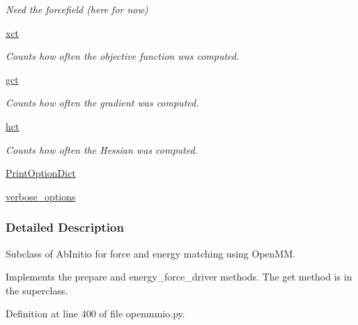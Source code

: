 \begin{DoxyCompactItemize}
\begin{DoxyCompactList}\small\item\em Need the forcefield (here for now) \end{DoxyCompactList}\item 
\hyperlink{classforcebalance_1_1target_1_1Target_aad2e385cfbf7b4a68f1c2cb41133fe82}{xct}
\begin{DoxyCompactList}\small\item\em Counts how often the objective function was computed. \end{DoxyCompactList}\item 
\hyperlink{classforcebalance_1_1target_1_1Target_aa625ac88c6744eb14ef281d9496d0dbb}{gct}
\begin{DoxyCompactList}\small\item\em Counts how often the gradient was computed. \end{DoxyCompactList}\item 
\hyperlink{classforcebalance_1_1target_1_1Target_a5b5a42f78052b47f29ed4b940c6111a1}{hct}
\begin{DoxyCompactList}\small\item\em Counts how often the Hessian was computed. \end{DoxyCompactList}\item 
\hyperlink{classforcebalance_1_1BaseClass_afc6659278497d7245bc492ecf405ccae}{Print\-Option\-Dict}
\item 
\hyperlink{classforcebalance_1_1BaseClass_afd68efa29ccd2f320f4cf82198214aac}{verbose\-\_\-options}
\end{DoxyCompactItemize}


\subsubsection{Detailed Description}
Subclass of Ab\-Initio for force and energy matching using Open\-M\-M. 

Implements the prepare and energy\-\_\-force\-\_\-driver methods. The get method is in the superclass. 

Definition at line 400 of file openmmio.\-py.



